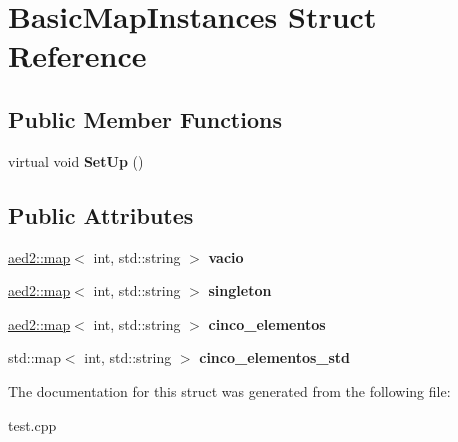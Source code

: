 \hypertarget{structBasicMapInstances}{\section{\-Basic\-Map\-Instances \-Struct \-Reference}
\label{structBasicMapInstances}
}
\subsection*{\-Public \-Member \-Functions}
\begin{DoxyCompactItemize}
\item 
\hypertarget{structBasicMapInstances_a66f8cc83d6d89e7159b1969243093a1d}{virtual void {\bfseries \-Set\-Up} ()}\label{structBasicMapInstances_a66f8cc83d6d89e7159b1969243093a1d}

\end{DoxyCompactItemize}
\subsection*{\-Public \-Attributes}
\begin{DoxyCompactItemize}
\item 
\hypertarget{structBasicMapInstances_afa06034bc81d2479282b6df29b0cf6cc}{\hyperlink{classaed2_1_1map}{aed2\-::map}$<$ int, std\-::string $>$ {\bfseries vacio}}\label{structBasicMapInstances_afa06034bc81d2479282b6df29b0cf6cc}

\item 
\hypertarget{structBasicMapInstances_a17659f8b129a190db2f9380efed940cc}{\hyperlink{classaed2_1_1map}{aed2\-::map}$<$ int, std\-::string $>$ {\bfseries singleton}}\label{structBasicMapInstances_a17659f8b129a190db2f9380efed940cc}

\item 
\hypertarget{structBasicMapInstances_a95190cd27e922b7ca66f21f4c7a68df0}{\hyperlink{classaed2_1_1map}{aed2\-::map}$<$ int, std\-::string $>$ {\bfseries cinco\-\_\-elementos}}\label{structBasicMapInstances_a95190cd27e922b7ca66f21f4c7a68df0}

\item 
\hypertarget{structBasicMapInstances_ada35982a8e0a421de615983d43c9b1ab}{std\-::map$<$ int, std\-::string $>$ {\bfseries cinco\-\_\-elementos\-\_\-std}}\label{structBasicMapInstances_ada35982a8e0a421de615983d43c9b1ab}

\end{DoxyCompactItemize}


\-The documentation for this struct was generated from the following file\-:\begin{DoxyCompactItemize}
\item 
test.\-cpp\end{DoxyCompactItemize}
